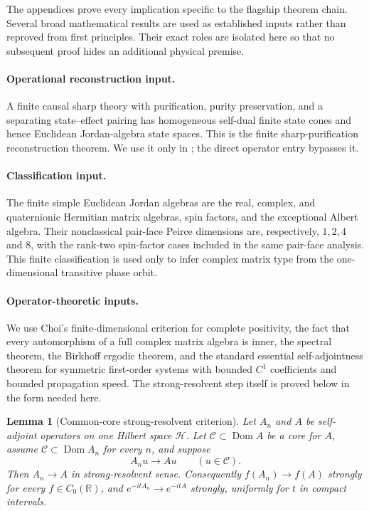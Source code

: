 \documentclass[11pt]{article}
\newtheorem{lemma}[theorem]{Lemma}
\theoremstyle{definition}
\theoremstyle{remark}
\newcommand{\R}{\mathbb R}
\newcommand{\Hh}{\mathcal H}
\newcommand{\Dom}{\operatorname{Dom}}
\begin{document}
The appendices prove every implication specific to the flagship theorem chain.
Several broad mathematical results are used as established inputs rather than
reproved from first principles.  Their exact roles are isolated here so that no
subsequent proof hides an additional physical premise.

\paragraph{Operational reconstruction input.}
A finite causal sharp theory with purification, purity preservation, and a
separating state--effect pairing has homogeneous self-dual finite state cones
and hence Euclidean Jordan-algebra state spaces.  This is the finite
sharp-purification reconstruction theorem.  We use it only in
; the direct operator entry bypasses it.

\paragraph{Classification input.}
The finite simple Euclidean Jordan algebras are the real, complex, and
quaternionic Hermitian matrix algebras, spin factors, and the exceptional
Albert algebra.  Their nonclassical pair-face Peirce dimensions are,
respectively, $1,2,4$ and $8$, with the rank-two spin-factor cases included in
the same pair-face analysis.  This finite classification is used only to infer
complex matrix type from the one-dimensional transitive phase orbit.

\paragraph{Operator-theoretic inputs.}
We use Choi's finite-dimensional criterion for complete positivity, the fact
that every automorphism of a full complex matrix algebra is inner, the spectral
theorem, the Birkhoff ergodic theorem, and the standard essential
self-adjointness theorem for symmetric first-order systems with bounded
$C^1$ coefficients and bounded propagation speed.  The strong-resolvent step
itself is proved below in the form needed here.

\begin{lemma}[Common-core strong-resolvent criterion]
\label{lem:app-core-resolvent}
Let $A_n$ and $A$ be self-adjoint operators on one Hilbert space $\Hh$.  Let
$\mathcal C\subset\Dom A$ be a core for $A$, assume
$\mathcal C\subset\Dom A_n$ for every $n$, and suppose
\[
  A_nu\longrightarrow Au
  \qquad (u\in\mathcal C).
\]
Then $A_n\to A$ in strong-resolvent sense.  Consequently
$f(A_n)\to f(A)$ strongly for every $f\in C_0(\R)$, and
$e^{-itA_n}\to e^{-itA}$ strongly, uniformly for $t$ in compact intervals.
\end{lemma}
\end{document}
